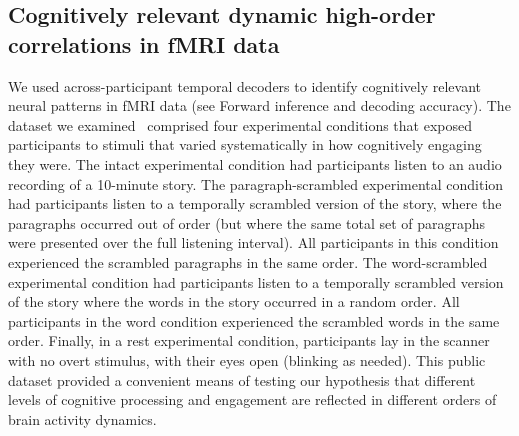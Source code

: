 \documentclass[english]{article}
\begin{document}
\subsection*{Cognitively relevant dynamic high-order correlations in
  fMRI data}
We used across-participant temporal decoders to identify cognitively
relevant neural patterns in fMRI data (see Forward inference
  and decoding accuracy).  The dataset we examined~\citep[collected
by][]{SimoEtal16} comprised four experimental conditions that exposed
participants to stimuli that varied systematically in how cognitively
engaging they were.  The intact experimental condition had
participants listen to an audio recording of a 10-minute story.  The
paragraph-scrambled experimental condition had participants
listen to a temporally scrambled version of the story, where the
paragraphs occurred out of order (but where the same total set of
paragraphs were presented over the full listening interval).  All
participants in this condition experienced the scrambled paragraphs in
the same order.  The word-scrambled experimental condition
had participants listen to a temporally scrambled version of the story
where the words in the story occurred in a random order.  All
participants in the word condition experienced the scrambled words in
the same order.  Finally, in a rest experimental condition,
participants lay in the scanner with no overt stimulus, with their
eyes open (blinking as needed).  This public dataset provided a convenient
means of testing our hypothesis that different levels of cognitive
processing and engagement are reflected in different orders of brain
activity dynamics.
\end{document}
